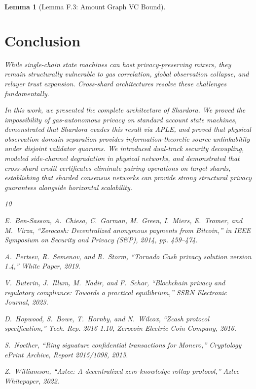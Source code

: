 \documentclass[journal,10pt,twocolumn]{IEEEtran}
\newtheorem{lemma}[theorem]{Lemma}
\theoremstyle{definition}
\theoremstyle{remark}
\begin{document}
\begin{lemma}[Lemma F.3: Amount Graph VC Bound]
\section{Conclusion}
While single-chain state machines can host privacy-preserving mixers, they remain structurally vulnerable to gas correlation, global observation collapse, and relayer trust expansion. Cross-shard architectures resolve these challenges fundamentally. 

In this work, we presented the complete architecture of Shardora. We proved the impossibility of gas-autonomous privacy on standard account state machines, demonstrated that Shardora evades this result via APLE, and proved that physical observation domain separation provides information-theoretic source unlinkability under disjoint validator quorums. We introduced dual-track security decoupling, modeled side-channel degradation in physical networks, and demonstrated that cross-shard credit certificates eliminate pairing operations on target shards, establishing that sharded consensus networks can provide strong structural privacy guarantees alongside horizontal scalability.


\begin{thebibliography}{10}

E.~Ben-Sasson, A.~Chiesa, C.~Garman, M.~Green, I.~Miers, E.~Tromer, and M.~Virza,
\newblock ``Zerocash: Decentralized anonymous payments from {Bitcoin},''
\newblock in \emph{IEEE Symposium on Security and Privacy (S\&P)}, 2014, pp. 459--474.

A.~Pertsev, R.~Semenov, and R.~Storm,
\newblock ``Tornado Cash privacy solution version 1.4,''
\newblock \emph{White Paper}, 2019.

V.~Buterin, J.~Illum, M.~Nadir, and F.~Schar,
\newblock ``Blockchain privacy and regulatory compliance: Towards a practical equilibrium,''
\newblock \emph{SSRN Electronic Journal}, 2023.

D.~Hopwood, S.~Bowe, T.~Hornby, and N.~Wilcox,
\newblock ``Zcash protocol specification,''
\newblock \emph{Tech. Rep. 2016-1.10}, Zerocoin Electric Coin Company, 2016.

S.~Noether,
\newblock ``Ring signature confidential transactions for {Monero},''
\newblock \emph{Cryptology ePrint Archive}, Report 2015/1098, 2015.

Z.~Williamson,
\newblock ``Aztec: A decentralized zero-knowledge rollup protocol,''
\newblock \emph{Aztec Whitepaper}, 2022.


\end{thebibliography}
\end{lemma}
\end{document}
